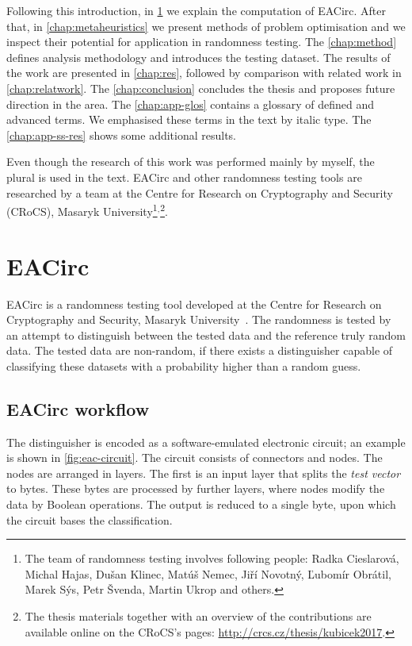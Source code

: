 \documentclass[
    digital,    %
    oneside,    %
    color,
    11pt,
    nocover,
    notable,
    nolof,
    nolot,
]{fithesis3}
\begin{document}
Following this introduction, in \cref{chap:eacirc} we explain the computation of EACirc. After that, in \cref{chap:metaheuristics} we present methods of problem optimisation and we inspect their potential for application in randomness testing. The \cref{chap:method} defines analysis methodology and introduces the testing dataset. The results of the work are presented in \cref{chap:res}, followed by comparison with related work in \cref{chap:relatwork}. The \cref{chap:conclusion} concludes the thesis and proposes future direction in the area. The \cref{chap:app-glos} contains a glossary of defined and advanced terms. We emphasised these terms in the text by italic type. The \cref{chap:app-ss-res} shows some additional results.

Even though the research of this work was performed mainly by myself, the plural is used in the text. EACirc and other randomness testing tools are researched by a team at the Centre for Research on Cryptography and Security (CRoCS), Masaryk University\footnote{The team of randomness testing involves following people: Radka Cieslarová, Michal Hajas, Dušan Klinec, Matúš Nemec, Jiří Novotný, Ľubomír Obrátil, Marek Sýs, Petr Švenda, Martin Ukrop and others.}$^{,}$\footnote{The thesis materials together with an overview of the contributions are available online on the CRoCS's pages: \url{http://crcs.cz/thesis/kubicek2017}.}.


\chapter{EACirc}
\label{chap:eacirc}

EACirc is a randomness testing tool developed at the Centre for Research on Cryptography and Security, Masaryk University~\cite{EACirc}. The randomness is tested by an attempt to distinguish between the tested data and the reference truly random data. The tested data are non-random, if there exists a distinguisher capable of classifying these datasets with a probability higher than a random guess.

\section{EACirc workflow}
\label{sec:eac-comp}

The distinguisher is encoded as a software-emulated electronic circuit; an example is shown in \cref{fig:eac-circuit}. The circuit consists of connectors and nodes. The nodes are arranged in layers. The first is an input layer that splits the \textit{test vector} to bytes. These bytes are processed by further layers, where nodes modify the data by Boolean operations. The output is reduced to a single byte, upon which the circuit bases the classification.
\end{document}

